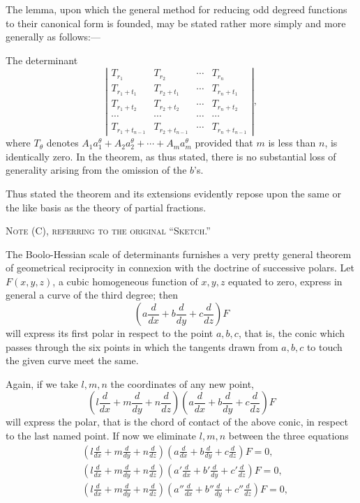 \documentclass[11pt]{article}
\begin{document}
{{The lemma, upon which the general method for reducing odd degreed functions to their canonical form is founded, may be stated rather more simply and more generally as follows:---

The determinant
\[
 \left|
 \begin{array}{cccc}
 T_{r_1}&T_{r_2}&\cdots&T_{r_n}\\
 T_{r_1+t_1}&T_{r_2+t_1}&\cdots&T_{r_n+t_1}\\
 T_{r_1+t_2}&T_{r_2+t_2}&\cdots&T_{r_n+t_2}\\
 \cdots&\cdots&\cdots&\cdots\\
 T_{r_1+t_{n-1}}&T_{r_2+t_{n-1}}&\cdots&T_{r_n+t_{n-1}}
 \end{array}
 \right|,
\]
where $T_\theta$ denotes $A_1a_1^\theta+A_2a_2^\theta+\cdots+A_ma_m^\theta$ provided that $m$ is less than $n$, is identically zero. In the theorem, as thus stated, there is no substantial loss of generality arising from the omission of the $b$'s.

Thus stated the theorem and its extensions evidently repose upon the same or the like basis as the theory of partial fractions.

\begin{center}{\scshape Note (C), referring to the original ``Sketch.''}\end{center}

The Boolo-Hessian scale of determinants furnishes a very pretty general theorem of geometrical reciprocity in connexion with the doctrine of successive polars. Let $F(x,y,z)$, a cubic homogeneous function of $x,y,z$ equated to zero, express in general a curve of the third degree; then
\[
 \left(a\frac{d}{dx}+b\frac{d}{dy}+c\frac{d}{dz}\right)F
\]
will express its first polar in respect to the point $a,b,c$, that is, the conic which passes through the six points in which the tangents drawn from $a,b,c$ to touch the given curve meet the same.

Again, if we take $l,m,n$ the coordinates of any new point,
\[
 \left(l\frac{d}{dx}+m\frac{d}{dy}+n\frac{d}{dz}\right)
 \left(a\frac{d}{dx}+b\frac{d}{dy}+c\frac{d}{dz}\right)F
\]
will express the polar, that is the chord of contact of the above conic, in respect to the last named point. If now we eliminate $l,m,n$ between the three equations
\[
\begin{aligned}
&\left(l\frac{d}{dx}+m\frac{d}{dy}+n\frac{d}{dz}\right)
 \left(a\frac{d}{dx}+b\frac{d}{dy}+c\frac{d}{dz}\right)F=0,\\
&\left(l\frac{d}{dx}+m\frac{d}{dy}+n\frac{d}{dz}\right)
 \left(a'\frac{d}{dx}+b'\frac{d}{dy}+c'\frac{d}{dz}\right)F=0,\\
&\left(l\frac{d}{dx}+m\frac{d}{dy}+n\frac{d}{dz}\right)
 \left(a''\frac{d}{dx}+b''\frac{d}{dy}+c''\frac{d}{dz}\right)F=0,
\end{aligned}
\]

}}
\end{document}

